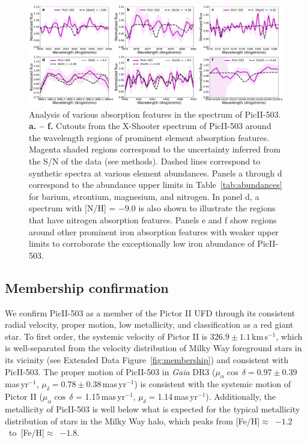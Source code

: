 \documentclass[pdflatex,sn-nature]{sn-jnl}%
\theoremstyle{thmstyleone}%
\theoremstyle{thmstyletwo}%
\theoremstyle{thmstylethree}%
\begin{document}
\begin{figure}[h]
\centering
\includegraphics[width=1.0\textwidth]{extended_data_f4.pdf}
\caption{Analysis of various absorption features in the spectrum of PicII-503.\\
\textbf{a. -- f.} Cutouts from the X-Shooter spectrum of PicII-503 around the wavelength regions of prominent element absorption features. 
Magenta shaded regions correspond to the uncertainty inferred from the S/N of the data (see methods).
Dashed lines correspond to synthetic spectra at various element abundances.
Panels a through d correspond to the abundance upper limits in Table~\ref{tab:abundances} for barium, strontium, magnesium, and nitrogen. 
In panel d, a spectrum with [N/H] = $-9.0$ is also shown to illustrate the regions that have nitrogen absorption features.
Panels e and f show regions around other prominent iron absorption features with weaker upper limits to corroborate the exceptionally low iron abundance of PicII-503.
}
\label{fig:allsynth}
\end{figure}

\subsection*{Membership confirmation}

We confirm PicII-503 as a member of the Pictor II UFD through its consistent radial velocity, proper motion, low metallicity, and classification as a red giant star. 
To first order, the systemic velocity of Pictor II is $326.9\pm1.1$\,km\,s$^{-1}$\cite{pace+25}, which is well-separated from the velocity distribution of Milky Way foreground stars in its vicinity (see Extended Data Figure~\ref{fig:membership}) and consistent with PicII-503. 
The proper motion of PicII-503 in \textit{Gaia} DR3 ($\mu_{\alpha}\cos\,\delta = 0.97\pm 0.39$\,mas\,yr$^{-1}$, $\mu_{\delta} = 0.78\pm0.38$\,mas\,yr$^{-1}$) is consistent with the systemic motion of Pictor II ($\mu_{\alpha}\cos\,\delta$ = 1.15\,mas\,yr$^{-1}$, $\mu_{\delta} = $1.14\,mas\,yr$^{-1}$)\cite{btt+22}.
Additionally, the metallicity of PicII-503 is well below what is expected for the typical metallicity distribution of stars in the Milky Way halo, which peaks from [Fe/H]$\approx$~$-1.2$~to~[Fe/H]$\approx$~$-1.8$\cite{cnz+19, ysm+21, cmf+21}.
\end{document}
